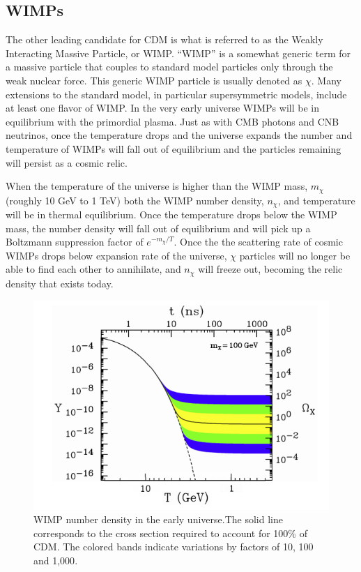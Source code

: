\subsection{WIMPs}
The other leading candidate for CDM is what is referred to as the Weakly Interacting Massive Particle, or WIMP. ``WIMP'' is a somewhat generic term for a massive particle that couples to standard model particles only through the weak nuclear force. This generic WIMP particle is usually denoted as $\chi$. Many extensions to the standard model, in particular supersymmetric models, include at least one flavor of WIMP. In the very early universe WIMPs will be in equilibrium with the primordial plasma. Just as with CMB photons and CNB neutrinos, once the temperature drops and the universe expands the number and temperature of WIMPs will fall out of equilibrium and the particles remaining will persist as a cosmic relic\cite{susyDM,wimp2}.

When the temperature of the universe is higher than the WIMP mass, $m_{\chi}$ (roughly 10  GeV to 1 TeV) both the WIMP number density, $n_{\chi}$, and temperature will be in thermal equilibrium. Once the temperature drops below the WIMP mass, the number density will fall out of equilibrium and will pick up a Boltzmann suppression factor of $e^{-m_{\chi}/T}$. Once the the scattering rate of cosmic WIMPs drops below expansion rate of the universe, $\chi$ particles will no longer be able to find each other to annihilate, and $n_{\chi}$ will freeze out, becoming the relic density that exists today\cite{wimp2}.

\begin{figure}[h!]
\centering
\includegraphics[width=150mm]{Figures/WIMP_relic_density.png}
\caption{WIMP number density in the early universe.The solid line corresponds to the cross section required to account for 100\% of CDM. The colored bands indicate variations by factors of 10, 100 and 1,000\cite{wimp2}.}
\label{fig:reldens} 
\end{figure}


